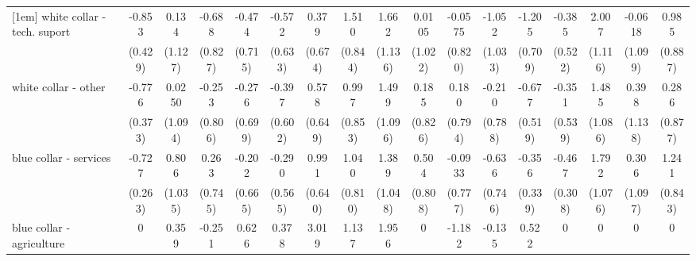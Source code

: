 {\begin{tabular}{l*{16}{c}}
[1em]
white collar - tech. suport&      -0.853\sym{*}  &       0.134         &      -0.688         &      -0.474         &      -0.572         &       0.379         &       1.510         &       1.662         &      0.0105         &     -0.0575         &      -1.052         &      -1.205         &      -0.385         &       2.007         &     -0.0618         &       0.985         \\
                    &     (0.429)         &     (1.127)         &     (0.827)         &     (0.715)         &     (0.633)         &     (0.674)         &     (0.844)         &     (1.136)         &     (1.022)         &     (0.820)         &     (1.033)         &     (0.709)         &     (0.522)         &     (1.116)         &     (1.099)         &     (0.887)         \\
[1em]
white collar - other&      -0.776\sym{*}  &      0.0250         &      -0.253         &      -0.276         &      -0.397         &       0.578         &       0.997         &       1.499         &       0.185         &       0.180         &      -0.210         &      -0.677         &      -0.351         &       1.485         &       0.398         &       0.286         \\
                    &     (0.373)         &     (1.094)         &     (0.806)         &     (0.699)         &     (0.602)         &     (0.649)         &     (0.853)         &     (1.096)         &     (0.826)         &     (0.794)         &     (0.788)         &     (0.519)         &     (0.539)         &     (1.086)         &     (1.138)         &     (0.877)         \\
[1em]
blue collar - services&      -0.727\sym{**} &       0.806         &       0.263         &      -0.202         &      -0.290         &       0.991         &       1.040         &       1.389         &       0.504         &     -0.0933         &      -0.636         &      -0.356         &      -0.467         &       1.792         &       0.306         &       1.241         \\
                    &     (0.263)         &     (1.035)         &     (0.745)         &     (0.665)         &     (0.565)         &     (0.640)         &     (0.810)         &     (1.048)         &     (0.808)         &     (0.777)         &     (0.746)         &     (0.339)         &     (0.308)         &     (1.076)         &     (1.097)         &     (0.843)         \\
[1em]
blue collar - agriculture&           0         &       0.359         &      -0.251         &       0.626         &       0.378         &       3.019\sym{***}&       1.137         &       1.956         &           0         &      -1.182         &      -0.135         &       0.522         &           0         &           0         &           0         &           0         \\

\end{tabular}}
